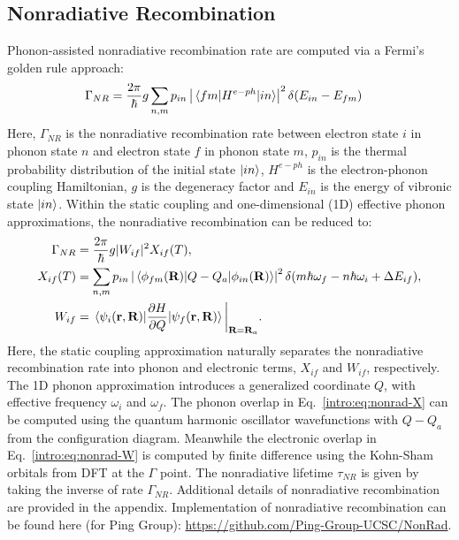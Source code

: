 \subsection{Nonradiative Recombination}
Phonon-assisted nonradiative recombination rate are computed via a Fermi's golden rule approach:
\begin{align}
    \Gamma_{NR} &= \frac{2\pi}{\hbar}g\sum_{n,m}p_{in}\left|\mel{fm}{H^{e-ph}}{in}\right|^2\delta(E_{in}-E_{fm}) \label{intro:eq:nonrad-full}
\end{align}
Here, $\Gamma_{NR}$ is the nonradiative recombination rate between electron state $i$ in phonon state $n$ and electron state $f$ in phonon state $m$, $p_{in}$ is the thermal probability distribution of the initial state $\ket{in}$, $H^{e-ph}$ is the electron-phonon coupling Hamiltonian, $g$ is the degeneracy factor and $E_{in}$ is the energy of vibronic state $\ket{in}$. Within the static coupling and one-dimensional (1D) effective phonon approximations, the nonradiative recombination can be reduced to:
\begin{align}
    \Gamma_{NR} &= \frac{2\pi}{\hbar}g|W_{if}|^2 X_{if}(T), \label{intro:eq:nonrad}\\
    X_{if}(T) &= \sum_{n,m}p_{in}\left|\mel{\phi_{fm}(\textbf{R})}{Q-Q_a}{\phi_{in}(\mathbf{R})}\right|^2 \delta(m\hbar\omega_f - n\hbar\omega_i+\Delta E_{if}), \label{intro:eq:nonrad-X} \\
    W_{if} &= \mel{\psi_i(\mathbf{r}, \textbf{R})}{\frac{\partial H}{\partial Q}}{\psi_f(\mathbf{r},\textbf{R})}\bigg{|}_{\textbf{R}=\textbf{R}_a}. \label{intro:eq:nonrad-W}
\end{align}
Here, the static coupling approximation naturally separates the nonradiative recombination rate into phonon and electronic terms, $X_{if}$ and $W_{if}$, respectively. The 1D phonon approximation introduces a generalized coordinate $Q$, with effective frequency $\omega_i$ and $\omega_f$. The phonon overlap in Eq.~\ref{intro:eq:nonrad-X} can be computed using the quantum harmonic oscillator wavefunctions with $Q-Q_a$ from the configuration diagram. Meanwhile the electronic overlap in Eq.~\ref{intro:eq:nonrad-W} is computed by finite difference using the Kohn-Sham orbitals from DFT at the $\Gamma$ point. The nonradiative lifetime $\tau_{NR}$ is given by taking the inverse of rate $\Gamma_{NR}$. Additional details of nonradiative recombination are provided in the appendix. Implementation of nonradiative recombination can be found here (for Ping Group): \url{https://github.com/Ping-Group-UCSC/NonRad}.


